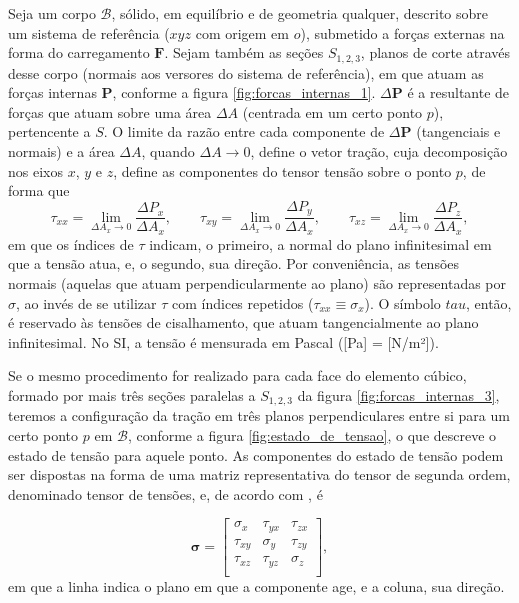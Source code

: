 

Seja um corpo $\mathcal{B}$, sólido, em equilíbrio e de geometria qualquer, descrito sobre um sistema de referência ($xyz$ com origem em $o$), submetido a forças externas na forma do carregamento $\bm{F}$. Sejam também as seções $S_{1,2,3}$, planos de corte através desse corpo (normais aos versores do sistema de referência), em que atuam as forças internas $\bm{P}$, conforme a figura \ref{fig:forcas_internas_1}. $\Delta \bm{P}$ é a resultante de forças que atuam sobre uma área $\Delta A$ (centrada em um certo ponto $p$), pertencente a $S$. O limite da razão entre cada componente de $\Delta \bm{P}$ (tangenciais e normais) e a área $\Delta A$, quando $\Delta A \to 0$, define o vetor tração, cuja decomposição nos eixos $x$, $y$ e $z$, define as componentes do tensor tensão sobre o ponto $p$, de forma que
\begin{equation}
    \tau_{xx} = \lim_{\Delta A_x \to 0} \frac{\Delta P_x}{\Delta A_x}, \qquad
    \tau_{xy} = \lim_{\Delta A_x \to 0} \frac{\Delta P_y}{\Delta A_x}, \qquad
    \tau_{xz} = \lim_{\Delta A_x \to 0} \frac{\Delta P_z}{\Delta A_x},
\end{equation}
em que os índices de $\tau$ indicam, o primeiro, a normal do plano infinitesimal em que a tensão atua, e, o segundo, sua direção. Por conveniência, as tensões normais (aquelas que atuam perpendicularmente ao plano) são representadas por $\sigma$, ao invés de se utilizar $\tau$ com índices repetidos ($\tau_{xx} \equiv \sigma_x$). O símbolo $tau$, então, é reservado às tensões de cisalhamento, que atuam tangencialmente ao plano infinitesimal. No SI, a tensão é mensurada em Pascal ([Pa] = [N/m²]).

Se o mesmo procedimento for realizado para cada face do elemento cúbico, formado por mais três seções paralelas a $S_{1,2,3}$ da figura \ref{fig:forcas_internas_3}, teremos a configuração da tração em três planos perpendiculares entre si para um certo ponto $p$ em $\mathcal{B}$,  conforme a figura \ref{fig:estado_de_tensao}, o que descreve o estado de tensão para aquele ponto. As componentes do estado de tensão podem ser dispostas na forma de uma matriz representativa do tensor de segunda ordem, denominado tensor de tensões, e, de acordo com , é

\begin{equation}
    \bm{\sigma} =
    \begin{bmatrix}
        \sigma_x & \tau_{yx} & \tau_{zx} \\
        \tau_{xy} & \sigma_{y} & \tau_{zy} \\
        \tau_{xz} & \tau_{yz} & \sigma_{z} \\
    \end{bmatrix},
\end{equation}
em que a linha indica o plano em que a componente age, e a coluna, sua direção.

